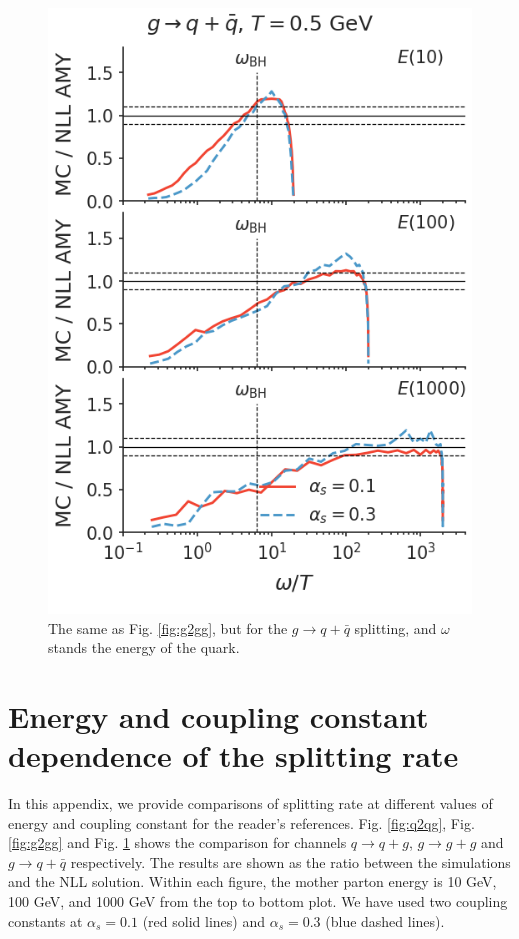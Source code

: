 \documentclass[aps, prc, reprint, amsmath, groupedaddress, nofootinbib]{revtex4-1}
\begin{document}
\begin{appendices}
\begin{figure}
\includegraphics[width=\columnwidth]{spectrum_E_g2qqbar.png}
\caption{The same as Fig. \ref{fig:g2gg}, but for the $g\rightarrow q+\bar{q}$ splitting, and $\omega$ stands the energy of the quark.}
\label{fig:g2qqbar}
\end{figure}

\section{Energy and coupling constant dependence of the splitting rate}
\label{app:tune-spectrum}
In this appendix, we provide comparisons of splitting rate at different values of energy and coupling constant for the reader's references.
Fig. \ref{fig:q2qg}, Fig. \ref{fig:g2gg} and Fig. \ref{fig:g2qqbar} shows the comparison for channels $q\rightarrow q+g$, $g\rightarrow g+g$ and $g\rightarrow q+\bar{q}$ respectively.
The results are shown as the ratio between the simulations and the NLL solution.
Within each figure, the mother parton energy is 10 GeV, 100 GeV, and 1000 GeV from the top to bottom plot.
We have used two coupling constants at $\alpha_s = 0.1$ (red solid lines) and $\alpha_s = 0.3$ (blue dashed lines).

\end{appendices}
 
\end{document}
